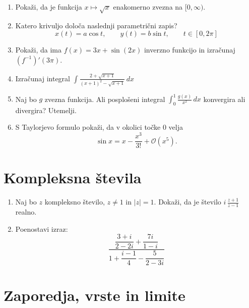 \documentclass[a4paper,12pt]{article}
\begin{document}
\begin{enumerate}
\item
Pokaži, da je funkcija \(x \mapsto \sqrt{x}\) enakomerno zvezna na \([0, \infty)\).

\item
Katero krivuljo določa naslednji parametrični zapis?
\[
x(t) = a \cos t, \qquad %
y(t) = b \sin t, \qquad %
t \in [0, 2 \pi]
\]

\item
Pokaži, da ima \(f(x) = 3x + \sin(2x)\) inverzno funkcijo in izračunaj \((f^{-1})'(3 \pi)\).

\item
Izračunaj integral
\(\displaystyle \int
\frac{2+\sqrt{x+1}}{(x+1)^2-\sqrt{x+1}}
\, dx
\)

\item
Naj bo \(g\) zvezna funkcija. Ali posplošeni integral
\(\int_{0}^{1} \frac{g(x)}{x^2} \, dx\)
konvergira ali divergira? Utemelji.

\item
S Taylorjevo formulo pokaži, da v okolici točke \(0\) velja
\[
\sin x = x - \frac{x^3}{3!} + \mathcal{O}(x^5).
\]
\end{enumerate}

\section*{Kompleksna števila}

\begin{enumerate}
\item
Naj bo \(z\) kompleksno število, \(z \ne 1\) in \(|z| = 1\).
Dokaži, da je število \( i \, \frac{z+1}{z-1} \) realno.

\item
Poenostavi izraz:
\[
\frac{
\dfrac{3 + i}{2-2i} + \dfrac{7i}{1 - i}
}{
1 + \dfrac{i - 1}{4} - \dfrac{5}{2 - 3i}
}
\]
\end{enumerate}

\section*{Zaporedja, vrste in limite}
\end{document}

